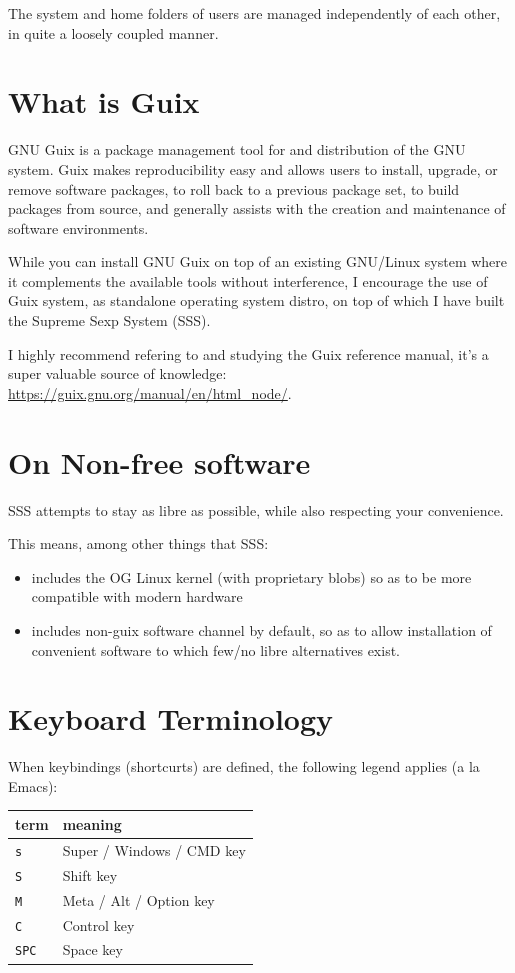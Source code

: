 \documentclass[11pt]{article}
\begin{document}
The system and home folders of users are managed independently of each other, in quite a loosely coupled manner.

\section{What is Guix}
\label{sec:orga73b6b2}

GNU Guix is a package management tool for and distribution of the GNU system. Guix makes reproducibility easy and allows users to install, upgrade, or remove software packages, to roll back to a previous package set, to build packages from source, and generally assists with the creation and maintenance of software environments.

While you can install GNU Guix on top of an existing GNU/Linux system where it complements the available tools without interference, I encourage the use of Guix system, as standalone operating system distro, on top of which I have built the Supreme Sexp System (SSS).

I highly recommend refering to and studying the Guix reference manual, it's a super valuable source of knowledge: \url{https://guix.gnu.org/manual/en/html\_node/}.

\section{On Non-free software}
\label{sec:org7287d22}

SSS attempts to stay as libre as possible, while also respecting your convenience.

This means, among other things that SSS:
\begin{itemize}
\item includes the OG Linux kernel (with proprietary blobs) so as to be more compatible with modern hardware
\item includes non-guix software channel by default, so as to allow installation of convenient software to which few/no libre alternatives exist.
\end{itemize}

\section{Keyboard Terminology}
\label{sec:org436f1fc}

When keybindings (shortcurts) are defined, the following legend applies (a la Emacs):

\begin{center}
\begin{tabular}{ll}
term & meaning\\[0pt]
\hline
\texttt{s} & Super / Windows / CMD key\\[0pt]
\texttt{S} & Shift key\\[0pt]
\texttt{M} & Meta / Alt / Option key\\[0pt]
\texttt{C} & Control key\\[0pt]
\texttt{SPC} & Space key\\[0pt]
\hline
\end{tabular}
\end{center}
\end{document}
